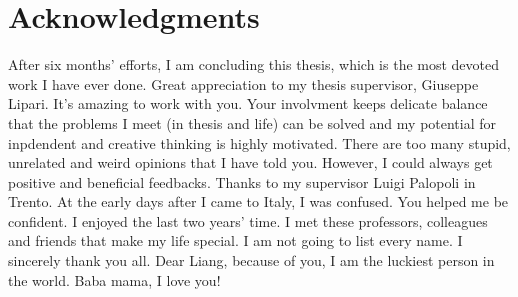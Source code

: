 \chapter{Acknowledgments}
After six months' efforts, I am concluding this thesis,
which is the most devoted work I have ever done. Great 
appreciation to my thesis supervisor, Giuseppe Lipari.
It's amazing to work with you. Your involvment keeps
delicate balance that the problems I meet (in thesis 
and life) can be solved and my potential for inpdendent 
and creative thinking is highly motivated. There are too 
many stupid, unrelated and weird opinions that I have 
told you. However, I could always get positive and 
beneficial feedbacks. 
Thanks to my supervisor Luigi Palopoli in Trento.
At the early days after I came to Italy, I was confused. 
You helped me be confident. 
I enjoyed the last two years' time. I met these professors, 
colleagues and friends that make my life special. I am not 
going to list every name. I sincerely thank you all. 
Dear Liang, because of you, I am the luckiest person in 
the world. 
Baba mama, I love you!
